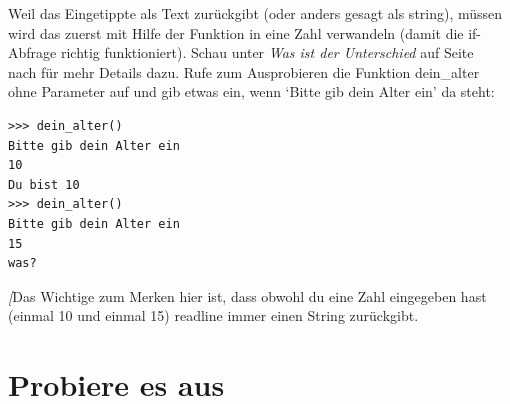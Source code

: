 Weil  das Eingetippte als Text zurückgibt (oder anders gesagt als string), müssen wird das zuerst mit Hilfe der Funktion  in eine Zahl verwandeln (damit die if-Abfrage richtig funktioniert). Schau unter \emph{Was ist der Unterschied} auf Seite~\pageref{whatsthedifference} nach für mehr Details dazu. Rufe zum Ausprobieren die Funktion dein\_alter ohne Parameter auf und gib etwas ein, wenn `Bitte gib dein Alter ein' da steht:

\begin{Verbatim}[frame=single]
>>> dein_alter()
Bitte gib dein Alter ein
10
Du bist 10
>>> dein_alter()
Bitte gib dein Alter ein
15
was?
\end{Verbatim}

\noindent
\emph[{Das Wichtige zum Merken hier ist, dass obwohl du eine Zahl eingegeben hast (einmal 10 und einmal 15) readline immer einen String zurückgibt.}


\section{Probiere es aus}

